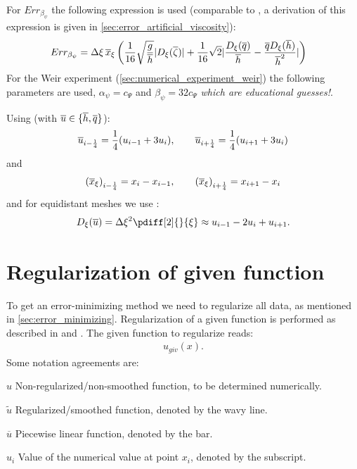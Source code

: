 For $Err_{\beta_{\psi}}$ the following expression is used (comparable to \citet[eq.\ 42]{Borsboom2001}, a derivation of this expression is given in \autoref{sec:error_artificial_viscosity}):
\begin{align}
    &Err_{\beta_{\psi}} = \Delta \xi\, \overline{x}_\xi \left( \frac{1}{16} \sqrt{\frac{g}{\overline{h}}} \lvert D_\xi(\overline\zeta) \rvert +
    \frac{1}{16} \sqrt{2} \lvert \frac{D_\xi(\overline{q})}{\overline{h}} - \frac{\overline{q} D_\xi(\overline{h})}{\overline{h}^2} \rvert \right)
\end{align}
For the Weir experiment (\autoref{sec:numerical_experiment_weir}) the following parameters are used, $\alpha_{\psi} = c_{\Psi}$ and $\beta_{\psi} = 32 c_{\Psi}$
\emph{which are educational guesses!}.

Using (with $\overline{u} \in \{\overline{h}, \overline{q}\}$):
\begin{align}
    \overline{u}_{i-\frac{1}{4}} = \frac{1}{4}(u_{i-1} + 3 u_{i}), \qquad \overline{u}_{i+\frac{1}{4}} = \frac{1}{4}(u_{i+1} + 3 u_{i})
\end{align}
and
\begin{align}
    {(\overline{x}_{\xi})}_{i-\frac{1}{4}}= x_i - x_{i-1}, \qquad
    {(\overline{x}_{\xi})}_{i+\frac{1}{4}}= x_{i+1} - x_{i}
\end{align}
and for equidistant meshes we use \citep[eq.\ 35]{Borsboom2001} :
\begin{align}
    D_\xi(\ubar) = \Dxi^2 \pdiff[2]{}{\xi} \approx u_{i-1} - 2 u_{i} + u_{i+1}.
\end{align}
\phantom{text}



\section{Regularization of given function}
To get an error-minimizing method we need to regularize all data, as mentioned in \autoref{sec:error_minimizing}.
Regularization of a given function is performed as described in \citet{Borsboom1998} and \citet{Borsboom2003}.
The given function to regularize reads:
\begin{align}
    u_{giv}(x).
\end{align}
Some notation agreements are:
\begin{symbollist}
    \item[$u$] Non-regularized/non-smoothed function, to be determined numerically.
    \item[$\widetilde u$] Regularized/smoothed function, denoted by the wavy line.
    \item[$\overline u$] Piecewise linear function, denoted by the bar.
    \item[$u_i$] Value of the numerical value at point $x_i$, denoted by the subscript.
\end{symbollist}

